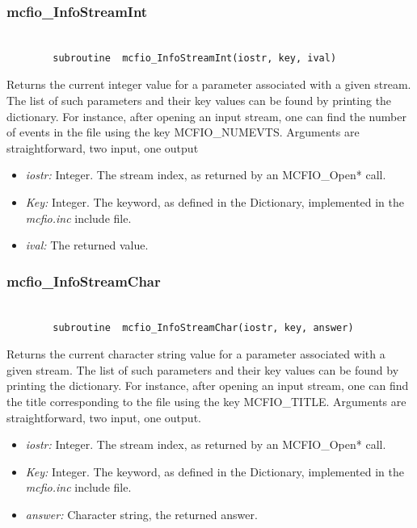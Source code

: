 \subsubsection{mcfio\_InfoStreamInt}

\begin{verbatim}

        subroutine  mcfio_InfoStreamInt(iostr, key, ival)

\end{verbatim}

Returns the current integer value for a parameter associated with a
given stream. The list of such parameters and their key values
can be found by printing the dictionary. For instance, after opening
an input stream, one can find the number of events in the file
using the key MCFIO\_NUMEVTS. Arguments are straightforward, two input,
one output

\begin{itemize}
\item {\em iostr:} Integer. The stream index, as returned by an MCFIO\_Open*
call.
\item {\em Key:} Integer. The keyword, as defined in the Dictionary,
implemented in the {\em mcfio.inc} include file.
\item {\em ival:} The  returned value.
\end{itemize}


\subsubsection{mcfio\_InfoStreamChar}

\begin{verbatim}

        subroutine  mcfio_InfoStreamChar(iostr, key, answer)

\end{verbatim}

Returns the current character string value for a parameter associated
with a given stream. The list of such parameters and their key values
can be found by printing the dictionary. For instance, after opening
an input stream, one can find the title corresponding to the file
using the key MCFIO\_TITLE. Arguments are straightforward, two input,
one output.

\begin{itemize}
\item {\em iostr:} Integer. The stream index, as returned by an MCFIO\_Open*
call.
\item {\em Key:} Integer. The keyword, as defined in the Dictionary,
implemented in the {\em mcfio.inc} include file.
\item {\em answer:} Character string,  the  returned answer.
\end{itemize}


